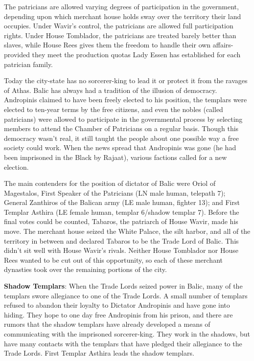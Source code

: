 {	The patricians are allowed varying degrees of participation in the government, depending upon which merchant house holds sway over the territory their land occupies. Under Wavir's control, the patricians are allowed full participation rights. Under House Tomblador, the patricians are treated barely better than slaves, while House Rees gives them the freedom to handle their own affairs-provided they meet the production quotas Lady Essen has established for each patrician family.
}
{
	Today the city-state has no sorcerer-king to lead it or protect it from the ravages of Athas. Balic has always had a tradition of the illusion of democracy. Andropinis claimed to have been freely elected to his position, the templars were elected to ten-year terms by the free citizens, and even the nobles (called patricians) were allowed to participate in the governmental process by selecting members to attend the Chamber of Patricians on a regular basis. Though this democracy wasn't real, it still taught the people about one possible way a free society could work. When the news spread that Andropinis was gone (he had been imprisoned in the Black by Rajaat), various factions called for a new election.

	The main contenders for the position of dictator of Balic were Oriol of Magestalos, First Speaker of the Patricians (LN male human, telepath 7); General Zanthiros of the Balican army (LE male human, fighter 13); and First Templar Asthira (LE female human, templar 6/shadow templar 7). Before the final votes could be counted, Tabaros, the patriarch of House Wavir, made his move. The merchant house seized the White Palace, the silt harbor, and all of the territory in between and declared Tabaros to be the Trade Lord of Balic. This didn't sit well with House Wavir's rivals. Neither House Tomblador nor House Rees wanted to be cut out of this opportunity, so each of these merchant dynasties took over the remaining portions of the city.

	\textbf{Shadow Templars}: When the Trade Lords seized power in Balic, many of the templars swore allegiance to one of the Trade Lords. A small number of templars refused to abandon their loyalty to Dictator Andropinis and have gone into hiding. They hope to one day free Andropinis from his prison, and there are rumors that the shadow templars have already developed a means of communicating with the imprisoned sorcerer-king. They work in the shadows, but have many contacts with the templars that have pledged their allegiance to the Trade Lords. First Templar Asthira leads the shadow templars.

}
